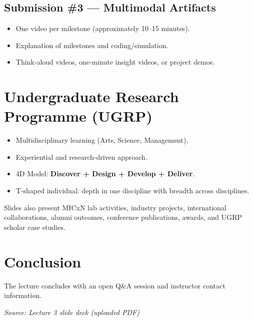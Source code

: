 \documentclass[11pt]{article}
\begin{document}
\subsection*{Submission \#3 --- Multimodal Artifacts}
\begin{itemize}
    \item One video per milestone (approximately 10--15 minutes).
    \item Explanation of milestones and coding/simulation.
    \item Think-aloud videos, one-minute insight videos, or project demos.
\end{itemize}

\section{Undergraduate Research Programme (UGRP)}

\begin{itemize}
    \item Multidisciplinary learning (Arts, Science, Management).
    \item Experiential and research-driven approach.
    \item 4D Model: \textbf{Discover + Design + Develop + Deliver}.
    \item T-shaped individual: depth in one discipline with breadth across disciplines.
\end{itemize}

Slides also present MICxN lab activities, industry projects, international collaborations, alumni outcomes, conference publications, awards, and UGRP scholar case studies.

\section{Conclusion}

The lecture concludes with an open Q\&A session and instructor contact information.

\vspace{1em}
\noindent\textit{Source: Lecture 3 slide deck (uploaded PDF)}
\end{document}
